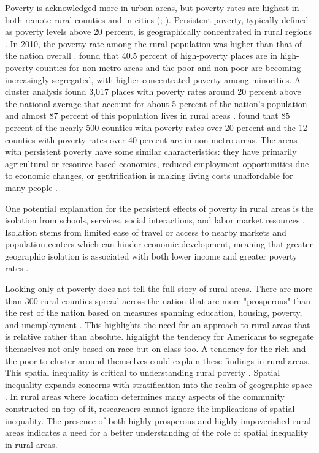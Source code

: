 Poverty is acknowledged more in urban areas, but poverty rates are highest in both remote rural counties and in cities (\citealp{miller_persistent_2003}; \citealp{crandall_local_2004}). Persistent poverty, typically defined as poverty levels above 20 percent, is geographically concentrated in rural regions \citep{crandall_local_2004}. In 2010, the poverty rate among the rural population was higher than that of the nation overall \citep{burton_inequality_2013}. \citet{lichter_rural_2011} found that 40.5 percent of high-poverty places are in high-poverty counties for non-metro areas and the poor and non-poor are becoming increasingly segregated, with higher concentrated poverty among minorities. A cluster analysis found 3,017 places with poverty rates around 20 percent above the national average that account for about 5 percent of the nation's population and almost 87 percent of this population lives in rural areas \citep{peters_typology_2009}. \citet{lichter_changing_2007} found that 85 percent of the nearly 500 counties with poverty rates over 20 percent and the 12 counties with poverty rates over 40 percent are in non-metro areas. The areas with persistent poverty have some similar characteristics: they have primarily agricultural or resource-based economies, reduced employment opportunities due to economic changes, or gentrification is making living costs unaffordable for many people \citep{robertson_rural_2007}. 

One potential explanation for the persistent effects of poverty in rural areas is the isolation from schools, services, social interactions, and labor market resources \citep{canto_rural_2014}. Isolation stems from limited ease of travel or access to nearby markets and population centers which can hinder economic development, meaning that greater geographic isolation is associated with both lower income and greater poverty rates \citep{blank_poverty_2005}.  

Looking only at poverty does not tell the full story of rural areas. There are more than 300 rural counties spread across the nation that are more "prosperous" than the rest of the nation based on measures spanning education, housing, poverty, and unemployment \citep{isserman_why_2009}. This highlights the need for an approach to rural areas that is relative rather than absolute. \citet{metzger_fair_2017} highlight the tendency for Americans to segregate themselves not only based on race but on class too. A tendency for the rich and the poor to cluster around themselves could explain these findings in rural areas. This spatial inequality is critical to understanding rural poverty \citep{thiede_spatial_2018}. Spatial inequality expands concerns with stratification into the realm of geographic space \citep{lobao_spatial_2002}. In rural areas where location determines many aspects of the community constructed on top of it, researchers cannot ignore the implications of spatial inequality. The presence of both highly prosperous and highly impoverished rural areas indicates a need for a better understanding of the role of spatial inequality in rural areas.  

